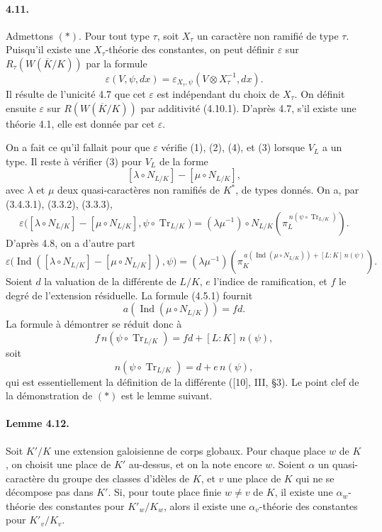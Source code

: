 \documentclass[10pt,letterpaper]{article}
\newcommand{\Ind}{\operatorname{Ind}}
\newcommand{\Tr}{\operatorname{Tr}}
\providecommand{\Tr}{\operatorname{Tr}}
\providecommand{\Tr}{\operatorname{Tr}}
\providecommand{\Tr}{\operatorname{Tr}}
\providecommand{\Ind}{\operatorname{Ind}}
\begin{document}
\paragraph{4.11.} Admettons \((*)\). Pour tout type \(\tau\), soit \(X_\tau\) un caractère non ramifié de type \(\tau\). Puisqu'il existe une \(X_\tau\)-théorie des constantes, on peut définir \(\varepsilon\) sur \(R_\tau(W(\overline K/K))\) par la formule
\[
\varepsilon(V,\psi,dx)=
\varepsilon_{X_\tau,\psi}(V\otimes X_\tau^{-1},dx).
\]
Il résulte de l'unicité 4.7 que cet \(\varepsilon\) est indépendant du choix de \(X_\tau\). On définit ensuite \(\varepsilon\) sur \(R(W(\overline K/K))\) par additivité (4.10.1). D'après 4.7, s'il existe une théorie 4.1, elle est donnée par cet \(\varepsilon\).

On a fait ce qu'il fallait pour que \(\varepsilon\) vérifie (1), (2), (4), et (3) lorsque \(V_L\) a un type. Il reste à vérifier (3) pour \(V_L\) de la forme
\[
[\lambda\circ N_{L/K}]-[\mu\circ N_{L/K}],
\]
avec \(\lambda\) et \(\mu\) deux quasi-caractères non ramifiés de \(K^*\), de types donnés. On a, par (3.4.3.1), (3.3.2), (3.3.3),
\[
\varepsilon\bigl([\lambda\circ N_{L/K}]-[\mu\circ N_{L/K}],
\psi\circ\Tr_{L/K}\bigr)
=
(\lambda\mu^{-1})\circ N_{L/K}
\left(\pi_L^{\,n(\psi\circ\Tr_{L/K})}\right).
\]
D'après 4.8, on a d'autre part
\[
\varepsilon\bigl(\Ind([\lambda\circ N_{L/K}]-[\mu\circ N_{L/K}]),\psi\bigr)
=
(\lambda\mu^{-1})
\left(\pi_K^{\,a(\Ind(\mu\circ N_{L/K}))+[L:K]\,n(\psi)}\right).
\]
Soient \(d\) la valuation de la différente de \(L/K\), \(e\) l'indice de ramification, et \(f\) le degré de l'extension résiduelle. La formule (4.5.1) fournit
\[
a(\Ind(\mu\circ N_{L/K}))=fd.
\]
La formule à démontrer se réduit donc à
\[
f\,n(\psi\circ\Tr_{L/K})=fd+[L:K]\,n(\psi),
\]
soit
\[
n(\psi\circ\Tr_{L/K})=d+e\,n(\psi),
\]
qui est essentiellement la définition de la différente ([10], III, §3). Le point clef de la démonstration de \((*)\) est le lemme suivant.

\paragraph{Lemme 4.12.} Soit \(K'/K\) une extension galoisienne de corps globaux. Pour chaque place \(w\) de \(K\), on choisit une place de \(K'\) au-dessus, et on la note encore \(w\). Soient \(\alpha\) un quasi-caractère du groupe des classes d'idèles de \(K\), et \(v\) une place de \(K\) qui ne se décompose pas dans \(K'\). Si, pour toute place finie \(w\ne v\) de \(K\), il existe une \(\alpha_w\)-théorie des constantes pour \(K'_w/K_w\), alors il existe une \(\alpha_v\)-théorie des constantes pour \(K'_v/K_v\).
\end{document}
